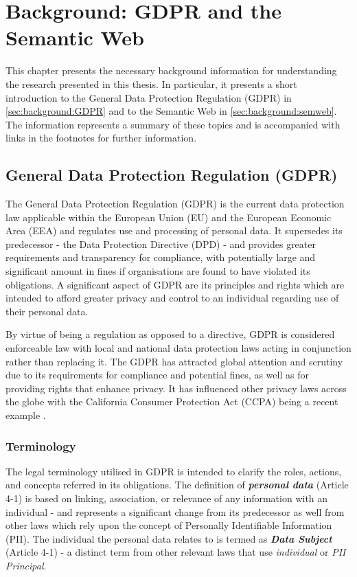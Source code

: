 \chapter{Background: GDPR and the Semantic Web}
\label{chapter:background}

This chapter presents the necessary background information for understanding the research presented in this thesis. In particular, it presents a short introduction to the General Data Protection Regulation (GDPR) in \autoref{sec:background:GDPR} and to the Semantic Web in \autoref{sec:background:semweb}. The information represents a summary of these topics and is accompanied with links in the footnotes for further information.

\section{General Data Protection Regulation (GDPR)}\label{sec:background:GDPR}
The General Data Protection Regulation (GDPR) \cite{Regulation_GDPR} is the current data protection law applicable within the European Union (EU) and the European Economic Area (EEA) and regulates use and processing of personal data. 
It supersedes its predecessor - the Data Protection Directive (DPD) \cite{directive_DPD} - and provides greater requirements and transparency for compliance, with potentially large and significant amount in fines if organisations are found to have violated its obligations.
A significant aspect of GDPR are its principles and rights which are intended to afford greater privacy and control to an individual regarding use of their personal data.

By virtue of being a regulation as opposed to a directive, GDPR is considered enforceable law with local and national data protection laws acting in conjunction rather than replacing it.
The GDPR has attracted global attention and scrutiny due to its requirements for compliance and potential fines, as well as for providing rights that enhance privacy.
It has influenced other privacy laws across the globe with the California Consumer Protection Act (CCPA) being a recent example \cite{marini_gdpr_2018}.

\subsection{Terminology}
The legal terminology utilised in GDPR is intended to clarify the roles, actions, and concepts referred in its obligations.
The definition of \textit{\textbf{personal data}} (Article 4-1) is based on linking, association, or relevance of any information with an individual - and represents a significant change from its predecessor as well from other laws which rely upon the concept of Personally Identifiable Information (PII). The individual the personal data relates to is termed as \textit{\textbf{Data Subject}} (Article 4-1) - a distinct term from other relevant laws that use \textit{individual} or \textit{PII Principal}.


